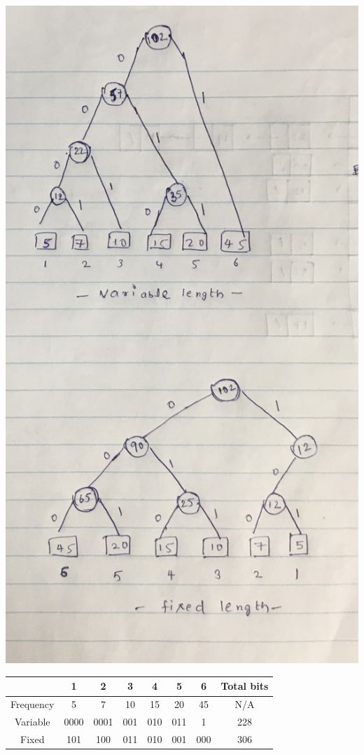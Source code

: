 \documentclass[11pt]{article}
\begin{document}
\includegraphics[scale=0.25]{Q3.jpeg}
\begin{center}
 \begin{tabular}{||c c c c c c c c||} 
 \hline
 \hline
   &1& 2 & 3 & 4&5&6&Total bits \\ [0.5ex] 
 \hline\hline
 Frequency& 5 & 7 & 10 &15&20&45&N/A\\ 
 \hline 
 Variable& 0000 & 0001 & 001 & 010&011&1&228\\
 \hline
 Fixed& 101 & 100 & 011 & 010&001&000&306\\[0.2ex]
 \hline
\end{tabular}
\end{center}
\end{document}
